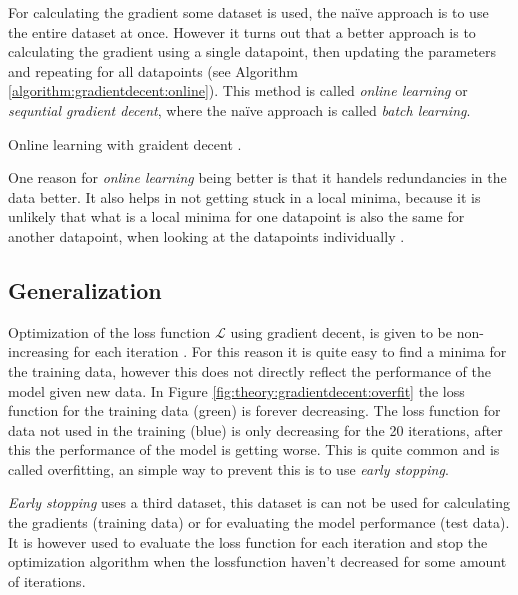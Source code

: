 For calculating the gradient some dataset is used, the naïve approach is to use the entire dataset at once. However it turns out that a better approach is to calculating the gradient using a single datapoint, then updating the parameters and repeating for all datapoints (see Algorithm \ref{algorithm:gradientdecent:online}). This method is called \textit{online learning} or \textit{sequntial gradient decent}, where the naïve approach is called \textit{batch learning}.

\begin{algorithm}[h]
 \DontPrintSemicolon
 \caption{Online learning with graident decent \cite{alexgraves}.}
 \label{algorithm:gradientdecent:online}
\end{algorithm}

One reason for \textit{online learning} being better is that it handels redundancies in the data better. It also helps in not getting stuck in a local minima, because it is unlikely that what is a local minima for one datapoint is also the same for another datapoint, when looking at the datapoints individually \cite{bishop}.

\subsection{Generalization}

Optimization of the loss function $\mathcal{L}$ using gradient decent, is given to be non-increasing for each iteration \cite{bishop}. For this reason it is quite easy to find a minima for the training data, however this does not directly reflect the performance of the model given new data. In Figure \ref{fig:theory:gradientdecent:overfit} the loss function for the training data (green) is forever decreasing. The loss function for data not used in the training (blue) is only decreasing for the 20 iterations, after this the performance of the model is getting worse. This is quite common and is called overfitting, an simple way to prevent this is to use \textit{early stopping}.

\textit{Early stopping} uses a third dataset, this dataset is can not be used for calculating the gradients (training data) or for evaluating the model performance (test data). It is however used to evaluate the loss function for each iteration and stop the optimization algorithm when the lossfunction haven't decreased for some amount of iterations. \cite{the-elements-of-statistical-learning, bishop, alexgraves}

